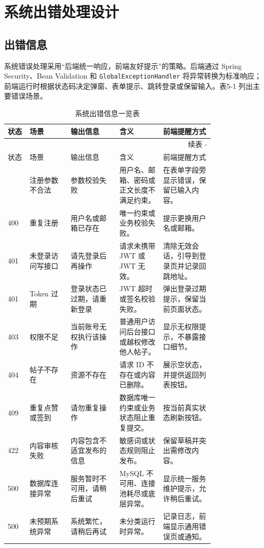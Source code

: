 \documentclass[UTF8,zihao=-4,a4paper]{ctexart}
\renewcommand{\thetable}{\thesection-\arabic{table}}
\begin{document}
\section{系统出错处理设计}

\subsection{出错信息}

系统错误处理采用“后端统一响应，前端友好提示”的策略。后端通过 Spring Security、Bean Validation 和 \texttt{GlobalExceptionHandler} 将异常转换为标准响应；前端运行时根据状态码决定弹窗、表单提示、跳转登录或保留输入。表5-1 列出主要错误场景。

\begin{longtable}{C{0.08\linewidth}L{0.16\linewidth}L{0.19\linewidth}L{0.17\linewidth}L{0.20\linewidth}}
\caption{系统出错信息一览表}\\
\toprule
状态 & 场景 & 输出信息 & 含义 & 前端提醒方式 \\
\midrule
\endfirsthead
\multicolumn{5}{r}{续表 \thetable}\\
\toprule
状态 & 场景 & 输出信息 & 含义 & 前端提醒方式 \\
\midrule
\endhead
\bottomrule
{} & 注册参数不合法 & 参数校验失败 & 用户名、邮箱、密码或正文长度不满足约束。 & 在表单字段旁显示错误，保留已输入内容。\\
400 & 重复注册 & 用户名或邮箱已存在 & 唯一约束或业务校验失败。 & 提示更换用户名或邮箱。\\
401 & 未登录访问写接口 & 请先登录后再操作 & 请求未携带 JWT 或 JWT 无效。 & 清除无效会话，引导到登录页并记录回跳地址。\\
401 & Token 过期 & 登录状态已过期，请重新登录 & JWT 超时或签名校验失败。 & 弹出登录过期提示，保留当前页面状态。\\
403 & 权限不足 & 当前账号无权执行该操作 & 普通用户访问后台接口或越权修改他人帖子。 & 显示无权限提示，不暴露接口细节。\\
404 & 帖子不存在 & 资源不存在 & 请求 ID 不存在或内容已删除。 & 展示空状态，并提供返回列表按钮。\\
409 & 重复点赞或签到 & 请勿重复操作 & 数据库唯一约束或业务状态阻止重复提交。 & 按当前真实状态刷新按钮。\\
422 & 内容审核失败 & 内容包含不适宜发布的信息 & 敏感词或状态规则阻止发布。 & 保留草稿并突出需修改内容。\\
500 & 数据库连接异常 & 服务暂时不可用，请稍后重试 & MySQL 不可用、连接池耗尽或底层异常。 & 显示统一服务维护提示，允许稍后重试。\\
500 & 未预期系统异常 & 系统繁忙，请稍后再试 & 未分类运行时异常。 & 记录日志，前端显示通用错误页或通知。\\
\end{longtable}
\end{document}
